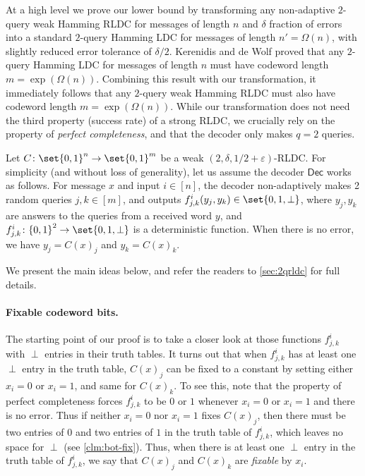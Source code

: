 \documentclass[10pt,a4paper]{article}
\theoremstyle{remark}
\newcommand{\zo}{\ensuremath{{\{0,1\}}}\xspace}
\newcommand{\eps}{\ensuremath{\varepsilon}}
\newcommand{\Dec}{\ensuremath{\mathsf{Dec}}\xspace}
\begin{document}
At a high level we prove our lower bound by transforming any non-adaptive $2$-query weak Hamming RLDC for messages of length $n$ and $\delta$ fraction of errors into a standard $2$-query Hamming LDC for messages of length $n'=\Omega(n)$, with slightly reduced error tolerance of $\delta/2$. Kerenidis and de Wolf \cite{KerenidisW04} proved that any $2$-query Hamming LDC for messages of length $n$ must have codeword length $m = \exp(\Omega(n))$. Combining this result with our transformation, it immediately follows that any $2$-query weak Hamming RLDC must also have codeword length $m = \exp(\Omega(n))$. While our transformation does not need the third property (success rate) of a strong RLDC, we crucially rely on the property of {\em perfect completeness}, and that the decoder only makes $q=2$ queries.
 
Let $C\colon\set{0,1}^n \rightarrow \set{0,1}^m$ be a weak $(2,\delta,1/2+\eps)$-RLDC. For simplicity (and without loss of generality), let us assume the decoder $\Dec$ works as follows. For message $x$ and input $i \in [n]$, the decoder non-adaptively makes 2 random queries $j ,k \in [m]$, and outputs $f_{j,k}^{i}(y_j, y_k) \in \set{0,1,\perp}$, where $y_j, y_k$ are answers to the queries from a received word $y$, and $f_{j,k}^{i} \colon \zo^2 \rightarrow \set{0,1,\perp}$ is a deterministic function. When there is no error, we have $y_j = C(x)_j$ and $y_k = C(x)_k$. 

We present the main ideas below, and refer the readers to \cref{sec:2qrldc} for full details.

\paragraph{Fixable codeword bits.} The starting point of our proof is to take a closer look at those functions $f_{j,k}^{i}$ with $\perp$ entries in their truth tables. It turns out that when $f_{j,k}^{i}$ has at least one $\perp$ entry in the truth table, $C(x)_j$ can be fixed to a constant by setting either $x_i=0$ or $x_i=1$, and same for $C(x)_k$. To see this, note that the property of perfect completeness forces $f_{j,k}^{i}$ to be $0$ or $1$ whenever $x_i=0$ or $x_i=1$ and there is no error. Thus if neither $x_i=0$ nor $x_i=1$ fixes $C(x)_j$, then there must be two entries of $0$ and two entries of $1$ in the truth table of $f_{j,k}^{i}$, which leaves no space for $\perp$ (see \cref{clm:bot-fix}). Thus, when there is at least one $\perp$ entry in the truth table of $f_{j,k}^{i}$, we say that $C(x)_j$ and $C(x)_k$ are \emph{fixable} by $x_i$.
\end{document}
